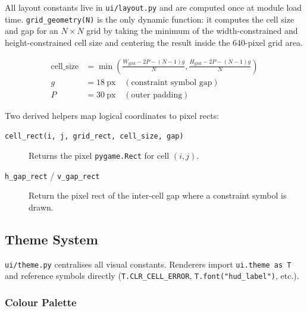 All layout constants live in \texttt{ui/layout.py} and are computed once at
module load time.
\texttt{grid\_geometry(N)} is the only dynamic function: it computes the
cell size and gap for an $N \times N$ grid by taking the minimum of the
width-constrained and height-constrained cell size and centering the result
inside the 640-pixel grid area.

\begin{align*}
  \text{cell\_size} &= \min\!\left(
    \frac{W_{\text{grid}} - 2P - (N-1)g}{N},
    \frac{H_{\text{grid}} - 2P - (N-1)g}{N}
  \right) \\
  g &= 18\ \text{px} \quad (\text{constraint symbol gap}) \\
  P &= 30\ \text{px} \quad (\text{outer padding})
\end{align*}

Two derived helpers map logical coordinates to pixel rects:

\begin{description}
  \item[\texttt{cell\_rect(i, j, grid\_rect, cell\_size, gap)}]
    Returns the pixel \texttt{pygame.Rect} for cell $(i,j)$.
  \item[\texttt{h\_gap\_rect} / \texttt{v\_gap\_rect}]
    Return the pixel rect of the inter-cell gap where a constraint symbol
    is drawn.
\end{description}

\subsection{Theme System}
\label{sec:ui_theme}

\texttt{ui/theme.py} centralises all visual constants.
Renderers import \texttt{ui.theme as T} and reference symbols directly
(\texttt{T.CLR\_CELL\_ERROR}, \texttt{T.font("hud\_label")}, etc.).

\subsubsection{Colour Palette}

